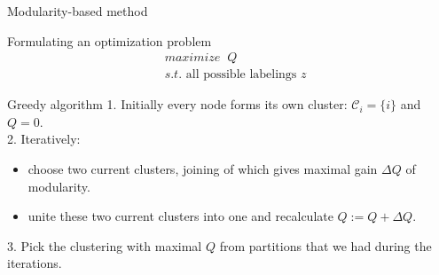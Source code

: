 \documentclass{beamer}
\theoremstyle{definition}
\theoremstyle{plain}
\theoremstyle{remark}
\begin{document}
			\begin{frame}{Modularity-based method}
			\vspace{-5pt}
				\begin{block}{Formulating an optimization problem}
					\begin{equation}
						\begin{aligned}
							&maximize\;\;Q\\
							&s.t. \text{ all possible labelings }z
						\nonumber
						\end{aligned}
					\end{equation}
				\end{block}

				\begin{block}{Greedy algorithm}
						1. Initially every node forms its own cluster: $\mathcal{C}_i = \{ i \}$ and $Q = 0$.\\
						2. Iteratively:
							\begin{itemize}
								\item choose two current clusters, joining of which gives maximal gain $\Delta Q$ of modularity.
								\item unite these two current clusters into one and recalculate $Q := Q + \Delta Q$.
							\end{itemize}
						3. Pick the clustering with maximal $Q$ from partitions that we had during the iterations.
				\end{block}
			\end{frame}
\end{document}

